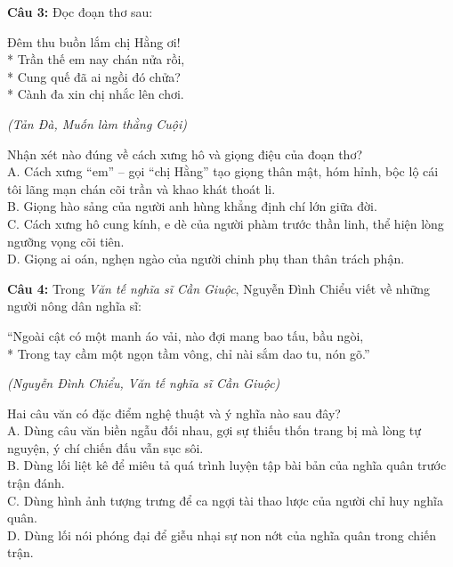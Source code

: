 \documentclass[12pt,a4paper]{article}
\begin{document}


\vspace{0.3cm}

\noindent \textbf{Câu 3:} Đọc đoạn thơ sau:
\begin{center}
Đêm thu buồn lắm chị Hằng ơi!\\*
Trần thế em nay chán nửa rồi,\\*
Cung quế đã ai ngồi đó chửa?\\*
Cành đa xin chị nhắc lên chơi.
\end{center}
\begin{flushright}\small\textit{(Tản Đà, Muốn làm thằng Cuội)}\end{flushright}
Nhận xét nào đúng về cách xưng hô và giọng điệu của đoạn thơ?\\
\noindent A. Cách xưng ``em'' – gọi ``chị Hằng'' tạo giọng thân mật, hóm hỉnh, bộc lộ cái tôi lãng mạn chán cõi trần và khao khát thoát li.\\
\noindent B. Giọng hào sảng của người anh hùng khẳng định chí lớn giữa đời.\\
\noindent C. Cách xưng hô cung kính, e dè của người phàm trước thần linh, thể hiện lòng ngưỡng vọng cõi tiên.\\
\noindent D. Giọng ai oán, nghẹn ngào của người chinh phụ than thân trách phận.



\vspace{0.3cm}

\noindent \textbf{Câu 4:} Trong \textit{Văn tế nghĩa sĩ Cần Giuộc}, Nguyễn Đình Chiểu viết về những người nông dân nghĩa sĩ:
\begin{center}
``Ngoài cật có một manh áo vải, nào đợi mang bao tấu, bầu ngòi,\\*
Trong tay cầm một ngọn tầm vông, chỉ nài sắm dao tu, nón gõ.''
\end{center}
\begin{flushright}\small\textit{(Nguyễn Đình Chiểu, Văn tế nghĩa sĩ Cần Giuộc)}\end{flushright}
Hai câu văn có đặc điểm nghệ thuật và ý nghĩa nào sau đây?\\
\noindent A. Dùng câu văn biền ngẫu đối nhau, gợi sự thiếu thốn trang bị mà lòng tự nguyện, ý chí chiến đấu vẫn sục sôi.\\
\noindent B. Dùng lối liệt kê để miêu tả quá trình luyện tập bài bản của nghĩa quân trước trận đánh.\\
\noindent C. Dùng hình ảnh tượng trưng để ca ngợi tài thao lược của người chỉ huy nghĩa quân.\\
\noindent D. Dùng lối nói phóng đại để giễu nhại sự non nớt của nghĩa quân trong chiến trận.
\end{document}
